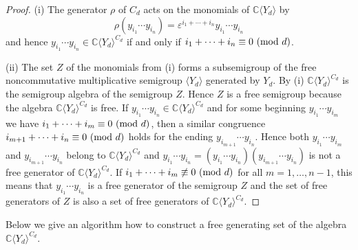 \documentclass{amsart}
\theoremstyle{definition}
\begin{document}
\begin{proof}
(i) The generator $\rho$ of $C_d$ acts on the monomials of ${\mathbb C}\langle Y_d\rangle$ by
\[
\rho(y_{i_1}\cdots y_{i_n})=\varepsilon^{i_1+\cdots+i_n}y_{i_1}\cdots y_{i_n}
\]
and hence $y_{i_1}\cdots y_{i_n}\in{\mathbb C}\langle Y_d\rangle^{C_d}$ if and only if $i_1+\cdots+i_n\equiv 0\text{ \rm (mod }d)$.

(ii) The set $Z$ of the monomials from (i) forms a subsemigroup of the free noncommutative multiplicative semigroup $\langle Y_d\rangle$ generated by $Y_d$. By (i)
${\mathbb C}\langle Y_d\rangle^{C_d}$ is the semigroup algebra of the semigroup $Z$. Hence $Z$ is a free semigroup because the algebra ${\mathbb C}\langle Y_d\rangle^{C_d}$ is free.
If $y_{i_1}\cdots y_{i_n}\in{\mathbb C}\langle Y_d\rangle^{C_d}$ and for some beginning $y_{i_1}\cdots y_{i_m}$ we have
$i_1+\cdots+i_m\equiv 0\text{ \rm (mod }d)$, then a similar congruence $i_{m+1}+\cdots+i_n\equiv 0\text{ \rm (mod }d)$ holds for the ending
$y_{i_{m+1}}\cdots y_{i_n}$. Hence both $y_{i_1}\cdots y_{i_m}$ and $y_{i_{m+1}}\cdots y_{i_n}$ belong to ${\mathbb C}\langle Y_d\rangle^{C_d}$
and $y_{i_1}\cdots y_{i_n}=(y_{i_1}\cdots y_{i_n})(y_{i_{m+1}}\cdots y_{i_n})$ is not a free generator of ${\mathbb C}\langle Y_d\rangle^{C_d}$.
If $i_1+\cdots+i_m\not\equiv 0\text{ \rm (mod }d)$ for all $m=1,\ldots,n-1$, this means that $y_{i_1}\cdots y_{i_n}$ is a free generator of the semigroup $Z$
and the set of free generators of $Z$ is also a set of free generators of ${\mathbb C}\langle Y_d\rangle^{C_d}$.
\end{proof}

Below we give an algorithm how to construct a free generating set of the algebra ${\mathbb C}\langle Y_d\rangle^{C_d}$.
\end{document}
